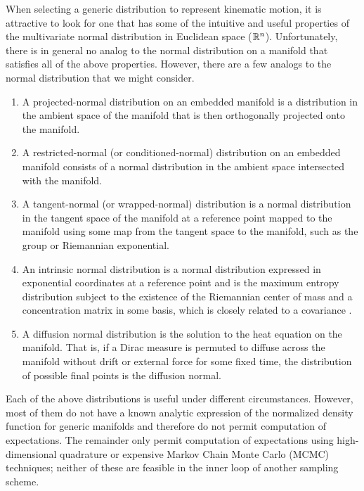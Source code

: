 \documentclass[../../main.tex]{subfiles}
\begin{document}
\begin{refsection}
	When selecting a generic distribution to represent kinematic motion, it is attractive to look for one that has some of the intuitive and useful properties of the multivariate normal distribution in Euclidean space ($\mathbb{R}^n$).
	Unfortunately, there is in general no analog to the normal distribution on a manifold that satisfies all of the above properties.
	However, there are a few analogs to the normal distribution that we might consider.
	\begin{enumerate}
		\item
		      A projected-normal distribution on an embedded manifold is a distribution in the ambient space of the manifold that is then orthogonally projected onto the manifold.
		\item
		      A restricted-normal (or conditioned-normal) distribution on an embedded manifold consists of a normal distribution in the ambient space intersected with the manifold.
		\item
		      A tangent-normal (or wrapped-normal) distribution is a normal distribution in the tangent space of the manifold at a reference point mapped to the manifold using some map from the tangent space to the manifold, such as the group or Riemannian exponential.
		\item
		      An intrinsic normal distribution is a normal distribution expressed in exponential coordinates at a reference point and is the maximum entropy distribution subject to the existence of the Riemannian center of mass and a concentration matrix in some basis, which is closely related to a covariance \supercite{pennecIntrinsicStatisticsRiemannian2006}.
		\item
		      A diffusion normal distribution is the solution to the heat equation on the manifold.
		      That is, if a Dirac measure is permuted to diffuse across the manifold without drift or external force for some fixed time, the distribution of possible final points is the diffusion normal.
	\end{enumerate}

	Each of the above distributions is useful under different circumstances.
	However, most of them do not have a known analytic expression of the normalized density function for generic manifolds and therefore do not permit computation of expectations.
	The remainder only permit computation of expectations using high-dimensional quadrature or expensive Markov Chain Monte Carlo (MCMC) techniques; neither of these are feasible in the inner loop of another sampling scheme.


\end{refsection}
\end{document}
